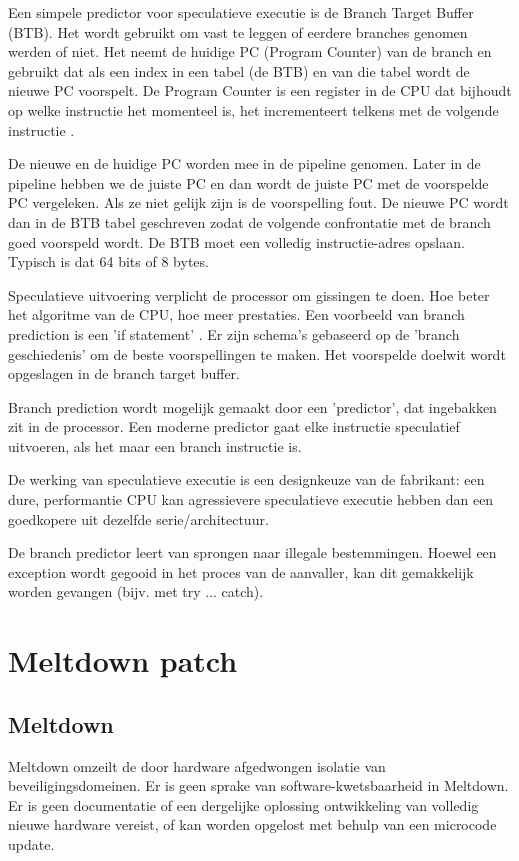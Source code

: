 Een simpele predictor voor speculatieve executie is de Branch Target Buffer (BTB). Het wordt gebruikt om vast te leggen of eerdere branches genomen werden of niet.
Het neemt de huidige PC (Program Counter) van de branch en gebruikt dat als een index in een tabel (de BTB) en van die tabel wordt de nieuwe PC voorspelt.
De Program Counter is een register in de CPU dat bijhoudt op welke instructie het momenteel is, het incrementeert telkens met de volgende instructie \parencite{Katzan1971}.

De nieuwe en de huidige PC worden mee in de pipeline genomen. Later in de pipeline hebben we de juiste PC en dan wordt de juiste PC met de voorspelde PC vergeleken. Als ze niet gelijk zijn is de voorspelling fout. De nieuwe PC wordt dan in de BTB tabel geschreven zodat de volgende confrontatie met de branch goed voorspeld wordt.
De BTB moet een volledig instructie-adres opslaan. Typisch is dat 64 bits of 8 bytes.

Speculatieve uitvoering verplicht de processor om gissingen te doen. Hoe beter het algoritme van de CPU, hoe meer prestaties. Een voorbeeld van branch prediction is een 'if statement' \parencite{Kocher2018}.
Er zijn schema's gebaseerd op de 'branch geschiedenis' om de beste voorspellingen te maken. Het voorspelde doelwit wordt opgeslagen in de branch target buffer.

Branch prediction wordt mogelijk gemaakt door een 'predictor', dat ingebakken zit in de processor.
Een moderne predictor gaat elke instructie speculatief uitvoeren, als het maar een branch instructie is.

De werking van speculatieve executie is een designkeuze van de fabrikant: een dure, performantie CPU kan agressievere speculatieve executie hebben dan een goedkopere uit dezelfde serie/architectuur.

De branch predictor leert van sprongen naar illegale
bestemmingen.
Hoewel een exception wordt gegooid in
het proces van de aanvaller, kan dit gemakkelijk worden gevangen (bijv.
met try ... catch)\parencite{Kocher2018}.



\section{Meltdown patch}
\subsection{Meltdown}
Meltdown omzeilt de door hardware afgedwongen isolatie van
beveiligingsdomeinen. Er is geen sprake van software-kwetsbaarheid
in Meltdown. Er is geen documentatie
of een dergelijke oplossing ontwikkeling van volledig
nieuwe hardware vereist, of kan worden opgelost met behulp van een microcode
update.

